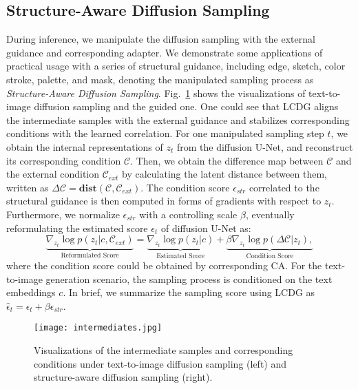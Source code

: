 \documentclass{article}
\begin{document}
\subsection{Structure-Aware Diffusion Sampling}
During inference, we manipulate the diffusion sampling with the external guidance and corresponding adapter. We demonstrate some applications of practical usage with a series of structural guidance, including edge, sketch, color stroke, palette, and mask, denoting the manipulated sampling process as \textit{Structure-Aware Diffusion Sampling}. Fig.~\ref{figure:visualizations of Intermediates} shows the visualizations of text-to-image diffusion sampling and the guided one. One could see that LCDG aligns the intermediate samples with the external guidance and stabilizes corresponding conditions with the learned correlation. For one manipulated sampling step $t$, we obtain the internal representations of $z_t$ from the diffusion U-Net, and reconstruct its corresponding condition $\mathcal{C}$. Then, we obtain the difference map between $\mathcal{C}$ and the external condition $\mathcal{C}_{ext}$ by calculating the latent distance between them, written as $\Delta \mathcal{C} =  \mathbf{dist}(\mathcal{C}, \mathcal{C}_{ext})$. The condition score $\epsilon_{str}$ correlated to the structural guidance is then computed in forms of gradients with respect to $z_t$. Furthermore, we normalize $\epsilon_{str}$ with a controlling scale $\beta$, eventually reformulating the estimated score $\epsilon_t$ of diffusion U-Net as:
\begin{equation}
\underbrace{\nabla_{z_t} \log p(z_{t}|c, \mathcal{C}_{ext})}_{\text{Reformulated Score}} = \underbrace{\nabla_{z_t} \log p(z_t|c)}_{\text{Estimated Score}} + \underbrace{\beta \nabla_{z_t} \log p(\Delta \mathcal{C}|z_t),}_{\text{Condition Score}}
\end{equation}
where the condition score could be obtained by corresponding CA. For the text-to-image generation scenario, the sampling process is conditioned on the text embeddings $c$. In brief, we summarize the sampling score using LCDG as $\hat{\epsilon}_t = \epsilon_t + \beta \epsilon_{str}$. 



\begin{figure}[t!]
  \centering
  \texttt{[image: intermediates.jpg]} \vspace{-1em}
  \caption{Visualizations of the intermediate samples and corresponding conditions under text-to-image diffusion sampling (left) and structure-aware diffusion sampling (right).}
\label{figure:visualizations of Intermediates}
\vspace{-1em}
\end{figure}
\end{document}
